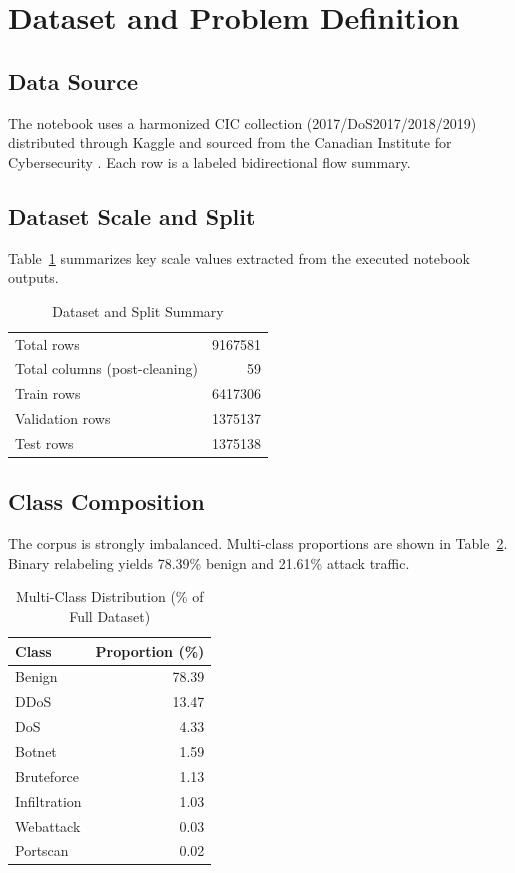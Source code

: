 \documentclass[10pt,journal]{IEEEtran}
\begin{document}
\section{Dataset and Problem Definition}
\subsection{Data Source}
The notebook uses a harmonized CIC collection (2017/DoS2017/2018/2019) distributed through Kaggle and sourced from the Canadian Institute for Cybersecurity \cite{cicdatasets, kaggleciccollection}. Each row is a labeled bidirectional flow summary.

\subsection{Dataset Scale and Split}
Table~\ref{tab:dataset_summary} summarizes key scale values extracted from the executed notebook outputs.

\begin{table}[!t]
\caption{Dataset and Split Summary}
\label{tab:dataset_summary}
\centering
\begin{tabular}{l r}
\toprule
Total rows & \num{9167581} \\
Total columns (post-cleaning) & 59 \\
Train rows & \num{6417306} \\
Validation rows & \num{1375137} \\
Test rows & \num{1375138} \\
\bottomrule
\end{tabular}
\end{table}

\subsection{Class Composition}
The corpus is strongly imbalanced. Multi-class proportions are shown in Table~\ref{tab:class_dist}. Binary relabeling yields 78.39\% benign and 21.61\% attack traffic.

\begin{table}[!t]
\caption{Multi-Class Distribution (\% of Full Dataset)}
\label{tab:class_dist}
\centering
\begin{tabular}{l r}
\toprule
Class & Proportion (\%) \\
\midrule
Benign & 78.39 \\
DDoS & 13.47 \\
DoS & 4.33 \\
Botnet & 1.59 \\
Bruteforce & 1.13 \\
Infiltration & 1.03 \\
Webattack & 0.03 \\
Portscan & 0.02 \\
\bottomrule
\end{tabular}
\end{table}
\end{document}
